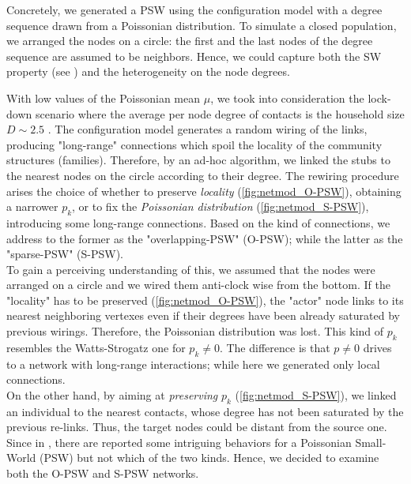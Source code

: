 \documentclass[a4paper,10pt, oneside]{book} %
\theoremstyle{definition}
\begin{document}
Concretely, we generated a PSW using the configuration model with a degree sequence drawn from a Poissonian distribution. To simulate a closed population, we arranged the nodes on a circle: the first and the last nodes of the degree sequence are assumed to be neighbors. Hence, we could capture both the SW property (see ) and the heterogeneity on the node degrees. 

With low values of the Poissonian mean $\mu$, we took into consideration the lock-down scenario where the average per node degree of contacts is the household size $D \sim 2.5$ \cite{Thurner::NetBasedExpl}. The configuration model generates a random wiring of the links, producing "long-range" connections which spoil the locality of the community structures (families). Therefore, by an ad-hoc algorithm, we linked the stubs to the nearest nodes on the circle according to their degree. 
The rewiring procedure arises the choice of whether to preserve \textit{locality}  (\autoref{fig:netmod_O-PSW}), obtaining a narrower $p_k$, or to fix the \textit{Poissonian distribution} (\autoref{fig:netmod_S-PSW}), introducing some long-range connections. Based on the kind of connections, we address to the former as the "overlapping-PSW" (O-PSW); while the latter as the "sparse-PSW" (S-PSW). \\
To gain a perceiving understanding of this, we assumed that the nodes were arranged on a circle and we wired them anti-clock wise from the bottom. If the "locality" has to be preserved (\autoref{fig:netmod_O-PSW}), the "actor" node links to its nearest neighboring vertexes even if their degrees have been already saturated by previous wirings. Therefore, the Poissonian distribution was lost. This kind of $ p_k$ resembles the Watts-Strogatz one for $ p_k \neq 0$. The difference is that $ p \neq 0$ drives to a network with long-range interactions; while here we generated only local connections.\\
On the other hand, by aiming at \textit{preserving} $p_k$ (\autoref{fig:netmod_S-PSW}), we linked an individual to the nearest contacts, whose degree has not been saturated by the previous re-links. Thus, the target nodes could be distant from the source one. Since in \cite{Thurner::Appendix_NetBasedExpl}, there are reported some intriguing behaviors for a Poissonian Small-World (PSW) but not which of the two kinds. Hence, we decided to examine both the O-PSW and S-PSW networks.
\end{document}
